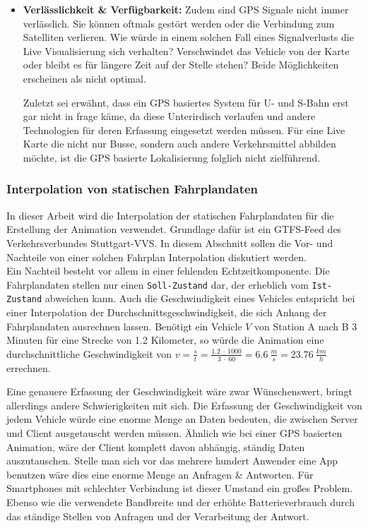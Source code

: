 \begin{itemize}
      \item \textbf{Verlässlichkeit \& Verfügbarkeit:} 
        Zudem sind GPS Signale nicht immer verlässlich. Sie können oftmals gestört werden oder die Verbindung zum Satelliten verlieren. Wie würde in einem solchen Fall eines Signalverlusts die Live Visualisierung sich verhalten? Verschwindet das Vehicle von der Karte oder bleibt es für längere Zeit auf der Stelle stehen? Beide Möglichkeiten erscheinen als nicht optimal. 

        Zuletzt sei erwähnt, dass ein GPS basiertes System für U- und S-Bahn erst gar nicht in frage käme, da diese Unterirdisch verlaufen und andere Technologien für deren Erfassung eingesetzt werden müssen. Für eine Live Karte die nicht nur Busse, sondern auch andere Verkehrsmittel abbilden möchte, ist die GPS basierte Lokalisierung folglich nicht zielführend.
    \end{itemize} 


    \subsubsection{Interpolation von statischen Fahrplandaten}
    \label{ssub:interpolation_von_statischen_fahrplandaten}
      In dieser Arbeit wird die Interpolation der statischen Fahrplandaten für die Erstellung der Animation verwendet. Grundlage dafür ist ein GTFS-Feed des Verkehrsverbundes Stuttgart-VVS.
      In diesem Abschnitt sollen die Vor- und Nachteile von einer solchen  Fahrplan Interpolation diskutiert werden.\\

      Ein Nachteil besteht vor allem in einer fehlenden Echtzeitkomponente. Die Fahrplandaten stellen nur einen \texttt{Soll-Zustand} dar, der erheblich vom \texttt{Ist-Zustand} abweichen kann. Auch die Geschwindigkeit eines Vehicles entspricht bei einer Interpolation der Durchschnittsgeschwindigkeit, die sich Anhang der Fahrplandaten ausrechnen lassen. Benötigt ein Vehicle $V$ von Station A nach B 3 Minuten für eine Strecke von 1.2 Kilometer, so würde die Animation eine durchschnittliche Geschwindigkeit von $v = \frac{s}{t} = \frac{1.2 \: \cdot \: 1000}{3 \: \cdot \: 60} = 6.6 \: \frac{m}{s} = 23.76 \: \frac{km}{h}$ errechnen.

      Eine genauere Erfassung der Geschwindigkeit wäre zwar Wünschenswert, bringt allerdings andere Schwierigkeiten mit sich. Die Erfassung der Geschwindigkeit von jedem Vehicle würde eine enorme Menge an Daten bedeuten, die zwischen Server und Client ausgetauscht werden müssen. Ähnlich wie bei einer GPS basierten Animation, wäre der Client komplett davon abhängig, ständig Daten auszutauschen. Stelle man sich vor das mehrere hundert Anwender eine App benutzen wäre dies eine enorme Menge an Anfragen \& Antworten. Für Smartphones mit schlechter Verbindung ist dieser Umstand ein großes Problem. Ebenso wie die verwendete Bandbreite und der erhöhte Batterieverbrauch durch das ständige Stellen von Anfragen und der Verarbeitung der Antwort.

